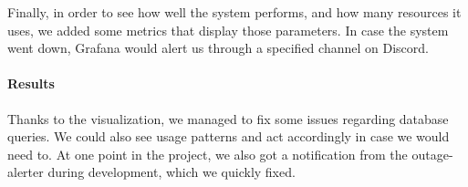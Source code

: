 Finally, in order to see how well the system performs, and how many resources it uses, we added some metrics that display those parameters. In case the system went down, Grafana would alert us through a specified channel on Discord.

\paragraph{Results}
Thanks to the visualization, we managed to fix some issues regarding database queries. We could also see usage patterns and act accordingly in case we would need to. At one point in the project, we also got a notification from the outage-alerter during development, which we quickly fixed.